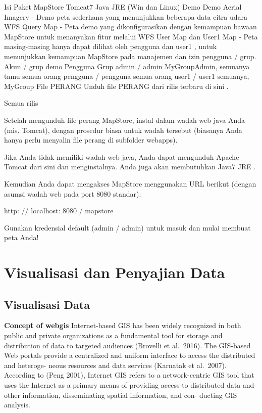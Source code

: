 \documentclass[]{book}
\begin{document}
Isi Paket
MapStore
Tomcat7
Java JRE (Win dan Linux)
Demo Demo
Aerial Imagery - Demo peta sederhana yang menunjukkan beberapa data citra udara
WFS Query Map - Peta demo yang dikonfigurasikan dengan kemampuan bawaan MapStore untuk menanyakan fitur melalui WFS
User Map dan User1 Map - Peta masing-masing hanya dapat dilihat oleh pengguna dan user1 , untuk menunjukkan kemampuan MapStore pada manajemen dan izin pengguna / grup.
Akun / grup demo
Pengguna Grup
admin / admin MyGroupAdmin, semuanya
tamu semua orang
pengguna / pengguna semua orang
user1 / user1 semuanya, MyGroup
File PERANG
Unduh file PERANG dari rilis terbaru di sini .

Semua rilis

Setelah mengunduh file perang MapStore, instal dalam wadah web java Anda (mis. Tomcat), dengan prosedur biasa untuk wadah tersebut (biasanya Anda hanya perlu menyalin file perang di subfolder webapps).

Jika Anda tidak memiliki wadah web java, Anda dapat mengunduh Apache Tomcat dari sini dan menginstalnya. Anda juga akan membutuhkan Java7 JRE .

Kemudian Anda dapat mengakses MapStore menggunakan URL berikut (dengan asumsi wadah web pada port 8080 standar):

http: // localhost: 8080 / mapstore

Gunakan kredensial default (admin / admin) untuk masuk dan mulai membuat peta Anda!

\hypertarget{part-visualisasi-dan-penyajian-data}{%
\part{Visualisasi dan Penyajian Data}\label{part-visualisasi-dan-penyajian-data}}

\hypertarget{visualisasi-data}{%
\chapter{Visualisasi Data}\label{visualisasi-data}}

\textbf{Concept of webgis}
Internet-based GIS has been widely recognized in both
public and private organizations as a fundamental tool for
storage and distribution of data to targeted audiences
(Brovelli et al.~2016).
The GIS-based Web portals provide a centralized and
uniform interface to access the distributed and heteroge-
neous resources and data services (Karnatak et al.~2007).
According to (Peng 2001), Internet GIS refers to a
network-centric GIS tool that uses the Internet as a primary
means of providing access to distributed data and other
information, disseminating spatial information, and con-
ducting GIS analysis.
\end{document}
